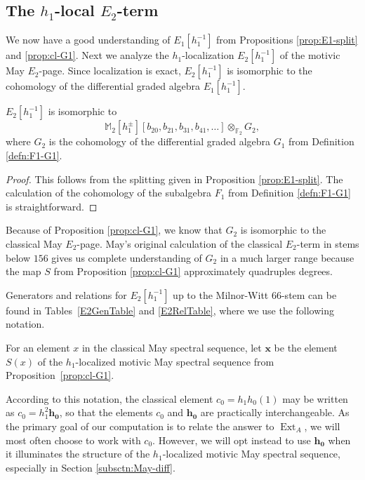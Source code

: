 \documentclass[10pt]{amsart}
\begin{document}
\subsection{The $h_1$-local $E_2$-term}
We now have a good understanding of $E_1[h_1^{-1}]$
from Propositions \ref{prop:E1-split} and \ref{prop:cl-G1}.
Next we analyze the $h_1$-localization
$E_2[h_1^{-1}]$ of the motivic May $E_2$-page.
Since localization is exact, $E_2[h_1^{-1}]$ is isomorphic
to the cohomology of the differential graded algebra
$E_1[h_1^{-1}]$.

\begin{prop}
$E_2[h_1^{-1}]$ is isomorphic to 
\[ {\ensuremath{\mathbb{M}}}_2[h_1^{\pm}][b_{20},b_{21},b_{31},b_{41},\dots] \otimes_{{\ensuremath{\mathbb{F}}}_2} G_2,\]
where 
$G_2$ is the cohomology of the differential graded algebra $G_1$
from Definition \ref{defn:F1-G1}.
\end{prop}

\begin{proof}
This follows from the splitting given in Proposition \ref{prop:E1-split}.
The calculation of the cohomology of the subalgebra $F_1$ from
Definition \ref{defn:F1-G1} is straightforward.
\end{proof}

Because of Proposition \ref{prop:cl-G1},
we know that $G_2$ is isomorphic to the classical
May $E_2$-page.
May's original calculation \cite{May} of the classical $E_2$-term in stems below $156$ gives us complete understanding of $G_2$ in a much larger range
because the map $S$ from Proposition \ref{prop:cl-G1} approximately
quadruples degrees.

Generators and relations for $E_2[h_1^{-1}]$ 
up to the Milnor-Witt 66-stem
can be found in Tables~\ref{E2GenTable} and \ref{E2RelTable},
where we use the following notation.

\begin{notn}
For an element $x$ in the classical May spectral sequence,
let ${\mathbf{{x}}}$ be the element $S(x)$ of the
$h_1$-localized motivic May spectral sequence from Proposition~\ref{prop:cl-G1}.
\end{notn}

According to this notation, the classical element $c_0 = h_1h_0(1)$ may be written as $c_0 = h_1^2{\mathbf{{h_0}}}$, so that the elements $c_0$ and ${\mathbf{{h_0}}}$ are practically interchangeable. As the primary goal of our computation is to relate the answer to $\operatorname{Ext}_A$, we will most often choose to work with $c_0$. 
However, we will opt instead to use ${\mathbf{{h_0}}}$ when it illuminates the 
structure of the $h_1$-localized motivic May spectral sequence,
especially in Section \ref{subsctn:May-diff}.
\end{document}
